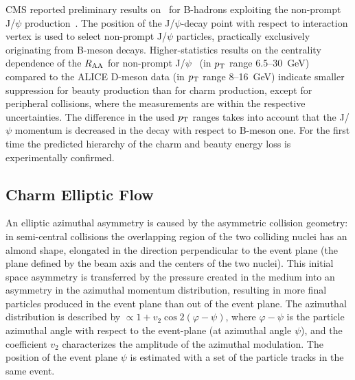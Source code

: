 CMS reported preliminary results on \Raa\ for B-hadrons exploiting the non-prompt J/$\psi$ production~\cite{Chatrchyan:2012np}.
The position of the J/$\psi$-decay point with respect to interaction vertex is used to select non-prompt J/$\psi$ particles, practically exclusively originating from B-meson decays. Higher-statistics results on the centrality dependence of the $R_{\rm AA}$ for non-prompt J/$\psi$~\cite{CMS:2012wba} (in $p_{\rm T}$ range 6.5--30~GeV) compared to the ALICE D-meson data (in $p_{\rm T}$ range 8--16~GeV) indicate smaller suppression for beauty production than for charm production, except for peripheral collisions, where the measurements are within the respective uncertainties. The difference in the used $p_{\rm T}$ ranges takes into account that the J/$\psi$ momentum is decreased in the decay with respect to B-meson one. For the first time the predicted hierarchy of the charm and beauty energy loss is experimentally confirmed.

\subsection{Charm Elliptic Flow}
\label{subsecks:heavyflow}
 An elliptic azimuthal asymmetry is caused by the asymmetric collision geometry: in semi-central collisions the overlapping region of the two colliding nuclei has an almond shape, elongated in the direction perpendicular to the event plane (the plane defined by the beam axis and the centers of the two nuclei). This initial space asymmetry is transferred by the pressure created in the medium into an asymmetry in the azimuthal momentum distribution, resulting in more final particles produced in the event plane than out of the event plane. The azimuthal distribution is described by $\propto 1 + v_2 \cos{2(\varphi - \psi)}$, where $\varphi - \psi$ is the particle azimuthal angle with respect to the event-plane (at azimuthal angle $\psi$), and the coefficient $v_2$ characterizes the amplitude of the azimuthal modulation. The position of the event plane $\psi$ is estimated with a set of the particle tracks in the same event.

